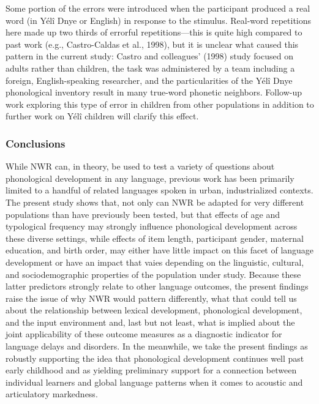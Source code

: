 \documentclass[english,,man,floatsintext]{apa6}
\begin{document}
Some portion of the errors were introduced when the participant produced a real word (in Yélî Dnye or English) in response to the stimulus. Real-word repetitions here made up two thirds of errorful repetitions---this is quite high compared to past work (e.g., Castro-Caldas et al., 1998), but it is unclear what caused this pattern in the current study: Castro and colleagues' (1998) study focused on adults rather than children, the task was administered by a team including a foreign, English-speaking researcher, and the particularities of the Yélî Dnye phonological inventory result in many true-word phonetic neighbors. Follow-up work exploring this type of error in children from other populations in addition to further work on Yélî children will clarify this effect.

\hypertarget{conclusions}{%
\subsubsection{Conclusions}\label{conclusions}}

While NWR can, in theory, be used to test a variety of questions about phonological development in any language, previous work has been primarily limited to a handful of related languages spoken in urban, industrialized contexts. The present study shows that, not only can NWR be adapted for very different populations than have previously been tested, but that effects of age and typological frequency may strongly influence phonological development across these diverse settings, while effects of item length, participant gender, maternal education, and birth order, may either have little impact on this facet of language development or have an impact that vaies depending on the linguistic, cultural, and sociodemographic properties of the population under study. Because these latter predictors strongly relate to other language outcomes, the present findings raise the issue of why NWR would pattern differently, what that could tell us about the relationship between lexical development, phonological development, and the input environment and, last but not least, what is implied about the joint applicability of these outcome measures as a diagnostic indicator for language delays and disorders. In the meanwhile, we take the present findings as robustly supporting the idea that phonological development continues well past early childhood and as yielding preliminary support for a connection between individual learners and global language patterns when it comes to acoustic and articulatory markedness.
\end{document}
